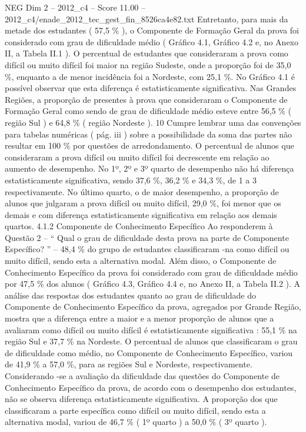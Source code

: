 \begin{textsample}{NEG Dim 2 – 2012\_c4 – Score 11.00 – 2012\_c4/enade\_2012\_tec\_gest\_fin\_8526ca4e82.txt}
Entretanto, para mais da metade dos estudantes ( 57,5 \% ), o Componente de Formação Geral da prova foi considerado com grau de dificuldade médio ( Gráfico 4.1, Gráfico 4.2 e, no Anexo II, a Tabela II.1 ).
O percentual de estudantes que consideraram a prova como difícil ou muito difícil foi maior na região Sudeste, onde a proporção foi de 35,0 \%, enquanto a de menor incidência foi a Nordeste, com 25,1 \%.
No Gráfico 4.1 é possível observar que esta diferença é estatisticamente significativa.
Nas Grandes Regiões, a proporção de presentes à prova que consideraram o Componente de Formação Geral como sendo de grau de dificuldade médio esteve entre 56,5 \% ( região Sul ) e 64,8 \% ( região Nordeste ). 10 Cumpre lembrar uma das convenções para tabelas numéricas ( pág. iii ) sobre a possibilidade da soma das partes não resultar em 100 \% por questões de arredondamento.
O percentual de alunos que consideraram a prova difícil ou muito difícil foi decrescente em relação ao aumento de desempenho.
No 1º, 2º e 3º quarto de desempenho não há diferença estatisticamente significativa, sendo 37,6 \%, 36,2 \% e 34,3 \%, de 1 a 3 respectivamente.
No último quarto, o de maior desempenho, a proporção de alunos que julgaram a prova difícil ou muito difícil, 29,0 \%, foi menor que os demais e com diferença estatisticamente significativa em relação aos demais quartos. 4.1.2 Componente de Conhecimento Específico Ao responderem à Questão 2 – “ Qual o grau de dificuldade desta prova na parte de Componente Específico? ” – 48,4 \% do grupo de estudantes classificaram -na como difícil ou muito difícil, sendo esta a alternativa modal.
Além disso, o Componente de Conhecimento Específico da prova foi considerado com grau de dificuldade médio por 47,5 \% dos alunos ( Gráfico 4.3, Gráfico 4.4 e, no Anexo II, a Tabela II.2 ).
A análise das respostas dos estudantes quanto ao grau de dificuldade do Componente de Conhecimento Específico da prova, agregados por Grande Região, mostra que a diferença entre a maior e a menor proporção de alunos que a avaliaram como difícil ou muito difícil é estatisticamente significativa : 55,1 \% na região Sul e 37,7 \% na Nordeste.
O percentual de alunos que classificaram o grau de dificuldade como médio, no Componente de Conhecimento Específico, variou de 41,9 \% a 57,0 \%, para as regiões Sul e Nordeste, respectivamente.
Considerando -se a avaliação da dificuldade das questões do Componente de Conhecimento Específico da prova, de acordo com o desempenho dos estudantes, não se observa diferença estatisticamente significativa.
A proporção dos que classificaram a parte específica como difícil ou muito difícil, sendo esta a alternativa modal, variou de 46,7 \% ( 1º quarto ) a 50,0 \% ( 3º quarto ).

\end{textsample}
